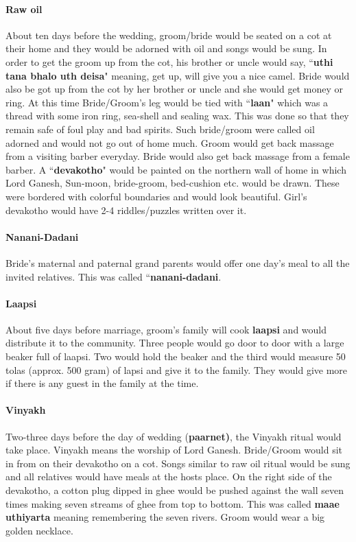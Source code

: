 \paragraph{Raw oil} About ten days before the wedding, groom/bride would be
seated on a cot at their home and they would be adorned with oil and songs
would be sung. In order to get the groom up from the cot, his brother or uncle
would say, ``\textbf{uthi tana bhalo uth deisa}" meaning, get up, will give you
a nice camel. Bride would also be got up from the cot by her brother or uncle
and she would get money or ring. At this time Bride/Groom's leg would be tied
with ``\textbf{laan}" which was a thread with some iron ring, sea-shell and
sealing wax. This was done so that they remain safe of foul play and bad
spirits. Such bride/groom were called oil adorned and would not go out of home
much. Groom would get back massage from a visiting barber everyday. Bride would
also get back massage from a female barber. A ``\textbf{devakotho}" would be
painted on the northern wall of home in which Lord Ganesh, Sun-moon,
bride-groom, bed-cushion etc. would be drawn. These were bordered with colorful
boundaries and would look beautiful. Girl's devakotho would have 2-4
riddles/puzzles written over it.

\paragraph{Nanani-Dadani} Bride's maternal and paternal grand parents would
offer one day's meal to all the invited relatives. This was called
``\textbf{nanani-dadani}.

\paragraph{Laapsi} About five days before marriage, groom's family will cook
\textbf{laapsi} and would distribute it to the community. Three people would go
door to door with a large beaker full of laapsi. Two would hold the beaker and
the third would measure 50 tolas (approx. 500 gram) of lapsi and give it to the
family. They would give more if there is any guest in the family at the time.

\paragraph{Vinyakh} Two-three days before the day of wedding (\textbf{paarnet)},
the Vinyakh ritual would take place. Vinyakh means the worship of Lord Ganesh.
Bride/Groom would sit in from on their devakotho on a cot. Songs similar to raw
oil ritual would be sung and all relatives would have meals at the hosts place.
On the right side of the devakotho, a cotton plug dipped in ghee would be
pushed against the wall seven times making seven streams of ghee from top to
bottom. This was called \textbf{maae uthiyarta} meaning remembering the seven
rivers. Groom would wear a big golden necklace.  

